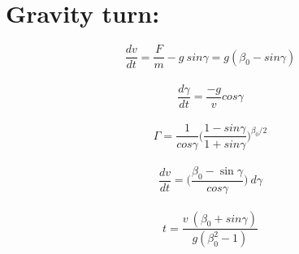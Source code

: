 \documentclass{article}
\begin{document}
{\section{\LARGE Gravity turn:}
{\LARGE $$ \frac{dv}{dt} = \frac{F}{m} - g\ sin\gamma = g(\beta_0 - sin\gamma)$$ \
$$ \frac{d\gamma}{dt} = \frac{-g}{v} cos\gamma$$ \
$$ \Gamma = \frac{1}{cos\gamma} \bigg( \frac{1 - sin\gamma}{1 + sin\gamma} \bigg) ^ {\beta_0 / 2} $$ \
$$ \frac{dv}{dt} = \bigg(\frac{\beta_0 - \sin \gamma}{cos \gamma}\bigg)\ d\gamma $$ \
$$ t = \frac{v\ (\beta_0 + sin\gamma)}{g(\beta_0 ^ 2 - 1)} $$
}
}
\end{document}
